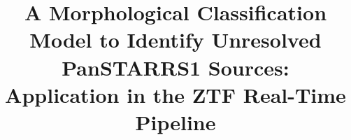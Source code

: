 \documentclass[twocolumn]{aastex62}
\begin{document}
\begin{CJK*}{UTF8}{gbsn}

\title{A Morphological Classification Model to Identify Unresolved 
       PanSTARRS1 Sources: \\
       Application in the ZTF Real-Time Pipeline
       }




\end{CJK*}
\end{document}
